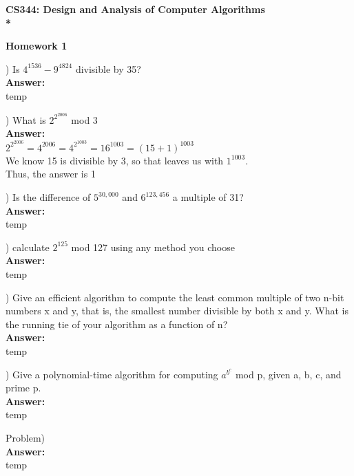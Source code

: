 \documentclass{article}
\begin{document}
\begin{center}
\bf{\LARGE CS344: Design and Analysis of Computer Algorithms} \\*

\vspace{0.2in}
{\bf {\Large Homework 1}}
\end{center}

\vspace{.2in}


\vspace{.2in}
) Is $4^{1536} - 9^{4824}$ divisible by 35? \\
\vspace{.1in}
{\bf Answer:} \\
\indent temp

\vspace{.3in}
) What is $2^{2^{2006}}$ mod 3 \\
\vspace{.1in}
{\bf Answer:} \\
\indent $2^{2^{2006}} =  4^{2006} = 4^{2^{1003}} = 16^{1003 } = (15 + 1)^{1003}$ \\
\indent We know 15 is divisible by 3, so that leaves us with $1^{1003}$. \\
\indent Thus, the answer is 1

\vspace{.3in}
) Is the difference of $5^{30,000}$ and $6^{123,456}$ a multiple of 31? \\
\vspace{.1in}
{\bf Answer:} \\
\indent temp

\vspace{.3in}
) calculate $2^{125}$ mod 127 using any method you choose \\
\vspace{.1in}
{\bf Answer:} \\
\indent temp

\vspace{.3in}
) Give an efficient algorithm to compute the least common multiple of two 
\indent n-bit numbers x and y, that is, the smallest number divisible by both x and 
\indent y. What is the running tie of your algorithm as a function of n? \\
\vspace{.1in}
{\bf Answer:} \\
\indent temp

\vspace{.3in}
) Give a polynomial-time algorithm for computing $a^{b^c}$ mod p, given a, b, c, 
\indent and prime p. \\
\vspace{.1in}
{\bf Answer:} \\
\indent temp

\vspace{.3in}
\noindent Problem) \\
\vspace{.1in}
{\bf Answer:} \\
\indent temp
\end{document}
